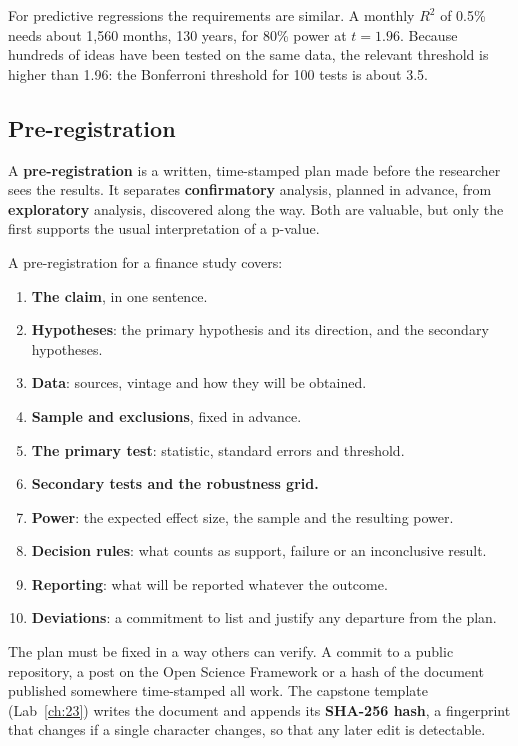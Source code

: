 For predictive regressions the requirements are similar. A monthly $R^2$ of 0.5\% needs about 1,560 months, 130 years, for 80\% power at $t = 1.96$. Because hundreds of ideas have been tested on the same data, the relevant threshold is higher than 1.96: the Bonferroni threshold for 100 tests is about 3.5.

\subsection{Pre-registration}
\label{sec:23-prereg}

A \textbf{pre-registration} is a written, time-stamped plan made before the researcher sees the results. It separates \textbf{confirmatory} analysis, planned in advance, from \textbf{exploratory} analysis, discovered along the way. Both are valuable, but only the first supports the usual interpretation of a p-value.

A pre-registration for a finance study covers:

\begin{enumerate}
  \item \textbf{The claim}, in one sentence.
  \item \textbf{Hypotheses}: the primary hypothesis and its direction, and the secondary hypotheses.
  \item \textbf{Data}: sources, vintage and how they will be obtained.
  \item \textbf{Sample and exclusions}, fixed in advance.
  \item \textbf{The primary test}: statistic, standard errors and threshold.
  \item \textbf{Secondary tests and the robustness grid.}
  \item \textbf{Power}: the expected effect size, the sample and the resulting power.
  \item \textbf{Decision rules}: what counts as support, failure or an inconclusive result.
  \item \textbf{Reporting}: what will be reported whatever the outcome.
  \item \textbf{Deviations}: a commitment to list and justify any departure from the plan.
\end{enumerate}

The plan must be fixed in a way others can verify. A commit to a public repository, a post on the Open Science Framework or a hash of the document published somewhere time-stamped all work. The capstone template (Lab~\ref{ch:23}) writes the document and appends its \textbf{SHA-256 hash}, a fingerprint that changes if a single character changes, so that any later edit is detectable.

